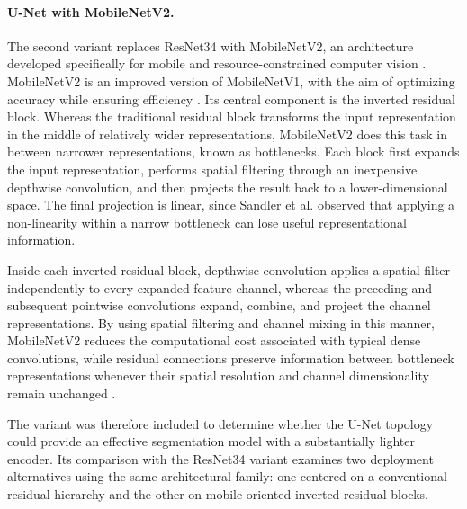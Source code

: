 \paragraph{U-Net with MobileNetV2.}

The second variant replaces ResNet34 with MobileNetV2, an architecture developed specifically for mobile and resource-constrained computer vision \cite{sandler2018mobilenetv2}. MobileNetV2 is an improved version of MobileNetV1, with the aim of optimizing accuracy while ensuring efficiency \cite{lightweight-survey}. Its central component is the inverted residual block.  Whereas the traditional residual block transforms the input representation in the middle of relatively wider representations, MobileNetV2 does this task in between narrower representations, known as bottlenecks. Each block first expands the input representation, performs spatial filtering through an inexpensive depthwise convolution, and then projects the result back to a lower-dimensional space. The final projection is linear, since Sandler et al. observed that applying a non-linearity within a narrow bottleneck can lose useful representational information.

Inside each inverted residual block, depthwise convolution applies a spatial filter independently to every expanded feature channel, whereas the preceding and subsequent pointwise convolutions expand, combine, and project the channel representations. By using spatial filtering and channel mixing in this manner, MobileNetV2 reduces the computational cost associated with typical dense convolutions, while residual connections preserve information between bottleneck representations whenever their spatial resolution and channel dimensionality remain unchanged \cite{sandler2018mobilenetv2}.

The variant was therefore included to determine whether the U-Net topology could provide an effective segmentation model with a substantially lighter encoder. Its comparison with the ResNet34 variant examines two deployment alternatives using the same architectural family: one centered on a conventional residual hierarchy and the other on mobile-oriented inverted residual blocks.

